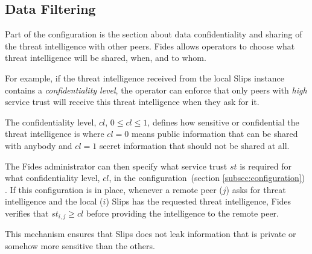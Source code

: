 \subsection{Data Filtering}
\label{subsec:data-filtering}
Part of the configuration is the section about data confidentiality and sharing of the threat intelligence with other peers.
Fides allows operators to choose what threat intelligence will be shared, when, and to whom.

For example, if the threat intelligence received from the local Slips instance contains a \textit{confidentiality level}, the operator can enforce that only peers with \textit{high} service trust will receive this threat intelligence when they ask for it.

The confidentiality level, $cl$, $0 \leq cl \leq 1$, defines how sensitive or confidential the threat intelligence is where $cl = 0$ means public information that can be shared with anybody and $cl = 1$ secret information that should not be shared at all.

The Fides administrator can then specify what service trust $st$ is required for what confidentiality level, $cl$, in the configuration~(section \ref{subsec:configuration}) .
If this configuration is in place, whenever a remote peer ($j$) asks for threat intelligence and the local ($i$) Slips has the requested threat intelligence, Fides verifies that $st_{i, j} \geq cl$ before providing the intelligence to the remote peer.

This mechanism ensures that Slips does not leak information that is private or somehow more sensitive than the others.